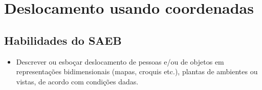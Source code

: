\chapter{Deslocamento usando coordenadas}

\section*{Habilidades do SAEB}

\begin{itemize}
  \item Descrever ou esboçar deslocamento de pessoas e/ou de objetos em
representações bidimensionais (mapas, croquis etc.), plantas de
ambientes ou vistas, de acordo com condições dadas.   

\end{itemize} 

